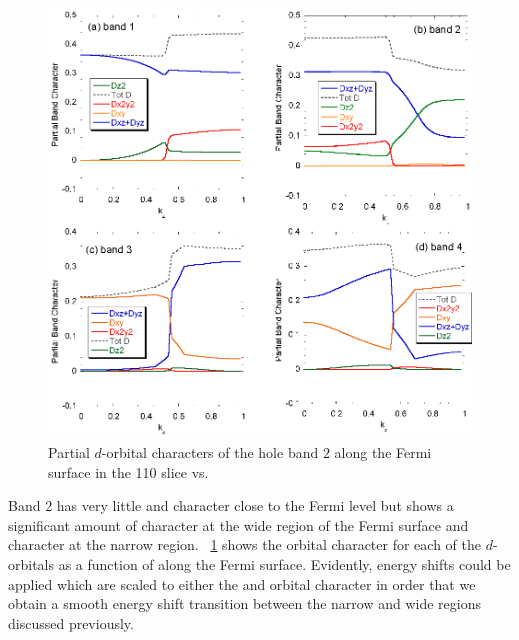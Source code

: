 \begin{figure}[h!]
    \begin{center}
        \includegraphics[scale=0.7]{Chapter3-dHvABaFe2P2/Figures/AngleDepMeasurements/BandCharacterVsKz/BandCharacterVsKz}
        \caption{Partial $d$-orbital characters of the hole band $2$ along the Fermi surface in the 110 slice vs. \kz}
        \label{Fig:3:Band2DCharacterVsKz}
    \end{center}
\end{figure}

Band $2$ has very little \Dxy and \DxTwoyTwo character close to the Fermi level but shows a significant amount of \DzTwo character at the wide region of the Fermi surface and \DxzDyz character at the narrow region. \Fig~\ref{Fig:3:Band2DCharacterVsKz} shows the orbital character for each of the $d$-orbitals as a function of \kz along the Fermi surface. Evidently, energy shifts could be applied which are scaled to either the \DzTwo and \DxzDyz orbital character in order that we obtain a smooth energy shift transition between the narrow and wide regions discussed previously.

